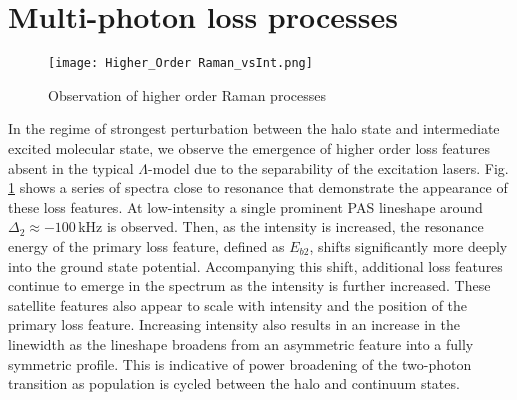 %

\section{Multi-photon loss processes} \label{sec:highE_coupling}
	\begin{figure} 
	\centerline{
	  \texttt{[image: Higher\_Order Raman\_vsInt.png]}}
	  \caption{Observation of higher order Raman processes}{}
	  \label{fig:highIntMultiPhoton}
	\end{figure}
In the regime of strongest perturbation between the halo state and intermediate excited molecular state, we observe the emergence of higher order loss features absent in the typical $\Lambda$-model due to the separability of the excitation lasers. %
Fig.\,\ref{fig:highIntMultiPhoton} shows a series of spectra close to resonance that demonstrate the appearance of these loss features.
At low-intensity a single prominent PAS lineshape around $\Delta_2 \approx -100$\,kHz is observed.
Then, as the intensity is increased, the resonance energy of the primary loss feature, defined as $E_{b2}$, shifts significantly more deeply into the ground state potential.
Accompanying this shift, additional loss features continue to emerge in the spectrum as the intensity is further increased. These satellite features also appear to scale with intensity and the position of the primary loss feature.
Increasing intensity also results in an increase in the linewidth as the lineshape broadens from an asymmetric feature into a fully symmetric profile.
This is indicative of power broadening of the two-photon transition as population is cycled between the halo and continuum states.

